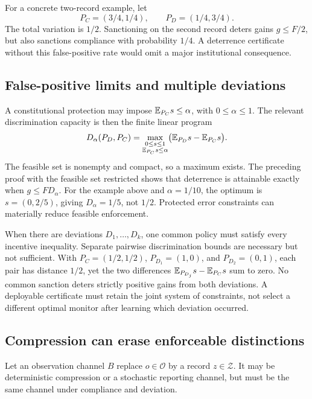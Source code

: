 For a concrete two-record example, let
\[
P_C=(3/4,1/4),\qquad P_D=(1/4,3/4).
\]
The total variation is $1/2$. Sanctioning on the second record deters gains $g\leq F/2$, but also sanctions compliance with probability $1/4$. A deterrence certificate without this false-positive rate would omit a major institutional consequence.

\subsection{False-positive limits and multiple deviations}
A constitutional protection may impose $\mathbb E_{P_C}s\leq\alpha$, with $0\leq\alpha\leq1$. The relevant discrimination capacity is then the finite linear program
\begin{equation}\label{MS:eq:protected-discrimination}
D_\alpha(P_D,P_C)=
\max_{\substack{0\leq s\leq1\\\mathbb E_{P_C}s\leq\alpha}}
\bigl(\mathbb E_{P_D}s-\mathbb E_{P_C}s\bigr).
\end{equation}
The feasible set is nonempty and compact, so a maximum exists. The preceding proof with the feasible set restricted shows that deterrence is attainable exactly when $g\leq F D_\alpha$. For the example above and $\alpha=1/10$, the optimum is $s=(0,2/5)$, giving $D_\alpha=1/5$, not $1/2$. Protected error constraints can materially reduce feasible enforcement.

When there are deviations $D_1,\ldots,D_k$, one common policy must satisfy every incentive inequality. Separate pairwise discrimination bounds are necessary but not sufficient. With $P_C=(1/2,1/2)$, $P_{D_1}=(1,0)$, and $P_{D_2}=(0,1)$, each pair has distance $1/2$, yet the two differences $\mathbb E_{P_{D_j}}s-\mathbb E_{P_C}s$ sum to zero. No common sanction deters strictly positive gains from both deviations. A deployable certificate must retain the joint system of constraints, not select a different optimal monitor after learning which deviation occurred.

\subsection{Compression can erase enforceable distinctions}
Let an observation channel $B$ replace $o\in\mathcal O$ by a record $z\in\mathcal Z$. It may be deterministic compression or a stochastic reporting channel, but must be the same channel under compliance and deviation.

